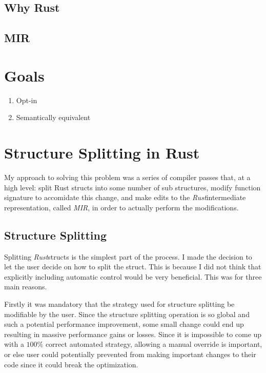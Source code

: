 \documentclass[12pt,final]{article}
\newcommand{\rustname}{{\small \em Rust}}
\def\rust{\rustname}
\newcommand{\mirname}{{\small \em MIR}}
\def\mir{\mirname}
\begin{document}
\subsection{Why Rust}

\subsection{MIR}

\section{Goals}
\label{sec:goal}

\begin{enumerate}
\item Opt-in
\item Semantically equivalent

\end{enumerate}

\section{Structure Splitting in Rust}

My approach to solving this problem was a series of compiler passes that, at a high level:
split Rust structs into some number of sub structures, modify function signature to accomidate this change,
and make edits to the \rust intermediate representation, called \mir, in order 
to actually perform the modifications.

\subsection{Structure Splitting}
Splitting \rust structs is the simplest part of the process. I made the decision to let the user decide
on how to split the struct. This is because I did not think that explicitly including automatic control would 
be very beneficial. This was for three main reasons. 

Firstly it was mandatory that the strategy used for structure splitting be modifiable by the user.
Since the structure splitting operation is so global and such a potential performance improvement,
some small change could end up resulting in massive performance gains or losses. Since it is impossible
to come up with a $100\%$ correct automated strategy, allowing a manual override is important, or else
user could potentially prevented from making important changes to their code since it could break the optimization.
\end{document}
